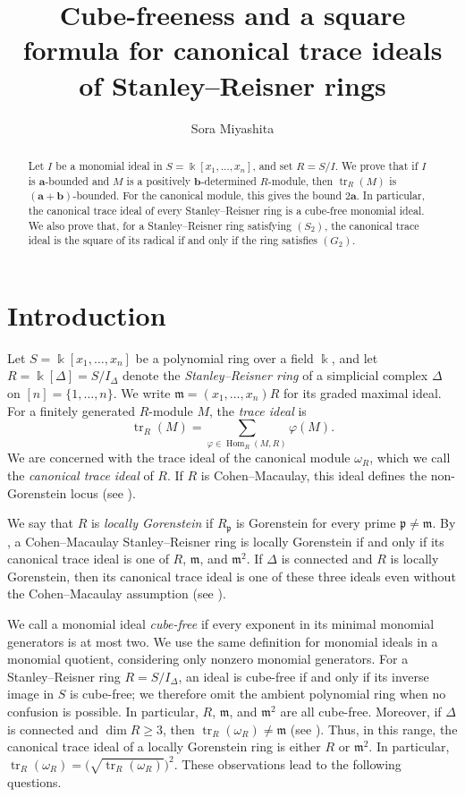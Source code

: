 \documentclass[a4paper,11pt]{amsart}
\author[S. Miyashita]{Sora Miyashita}
\date{}
\title[Canonical trace ideals of Stanley--Reisner rings]{Cube-freeness and a square formula for canonical trace ideals of Stanley--Reisner rings}
\theoremstyle{plain}
\theoremstyle{definition}
\theoremstyle{remark}
\DeclareMathOperator{\tr}{tr}
\DeclareMathOperator{\Hom}{Hom}
\newcommand{\kk}{\Bbbk}
\newcommand{\mm}{\mathfrak m}
\begin{document}
\begin{abstract}
Let $I$ be a monomial ideal in $S=\kk[x_1,\ldots,x_n]$, and set $R=S/I$. We prove that if $I$ is $\mathbf{a}$-bounded and $M$ is a positively $\mathbf{b}$-determined $R$-module, then $\tr_R(M)$ is $(\mathbf{a}+\mathbf{b})$-bounded. For the canonical module, this gives the bound $2\mathbf{a}$. In particular, the canonical trace ideal of every Stanley--Reisner ring is a cube-free monomial ideal. We also prove that, for a Stanley--Reisner ring satisfying $(S_2)$, the canonical trace ideal is the square of its radical if and only if the ring satisfies $(G_2)$.
\end{abstract}
\maketitle

\section{Introduction}\label{sec:introduction}

Let $S=\kk[x_1,\ldots,x_n]$ be a polynomial ring over a field $\kk$, and let $R=\kk[\Delta]=S/I_\Delta$ denote the \emph{Stanley--Reisner ring} of a simplicial complex $\Delta$ on $[n]=\{1,\ldots,n\}$. We write $\mm=(x_1,\ldots,x_n)R$ for its graded maximal ideal. For a finitely generated $R$-module $M$, the \emph{trace ideal} is
\[
\tr_R(M)=\sum_{\varphi\in\Hom_R(M,R)}\varphi(M).
\] We are concerned with the trace ideal of the canonical module $\omega_R$, which we call the \emph{canonical trace ideal} of $R$. If $R$ is Cohen--Macaulay, this ideal defines the non-Gorenstein locus (see \cite[Lemma~2.1]{HHS}).

We say that $R$ is \emph{locally Gorenstein} if $R_{\mathfrak p}$ is Gorenstein for every prime $\mathfrak p\ne\mm$. By \cite[Theorem~A]{MV}, a Cohen--Macaulay Stanley--Reisner ring is locally Gorenstein if and only if its canonical trace ideal is one of $R$, $\mm$, and $\mm^2$. If $\Delta$ is connected and $R$ is locally Gorenstein, then its canonical trace ideal is one of these three ideals even without the Cohen--Macaulay assumption (see \cite[Theorem~4.19]{KM26}).

We call a monomial ideal \emph{cube-free} if every exponent in its minimal monomial generators is at most two. We use the same definition for monomial ideals in a monomial quotient, considering only nonzero monomial generators. For a Stanley--Reisner ring $R=S/I_\Delta$, an ideal is cube-free if and only if its inverse image in $S$ is cube-free; we therefore omit the ambient polynomial ring when no confusion is possible. In particular, $R$, $\mm$, and $\mm^2$ are all cube-free. Moreover, if $\Delta$ is connected and $\dim R\geq3$, then $\tr_R(\omega_R)\ne\mm$ (see \cite[Corollary~4.20]{KM26}). Thus, in this range, the canonical trace ideal of a locally Gorenstein ring is either $R$ or $\mm^2$. In particular, $\tr_R(\omega_R)=\bigl(\sqrt{\tr_R(\omega_R)}\bigr)^2$. These observations lead to the following questions.
\end{document}
